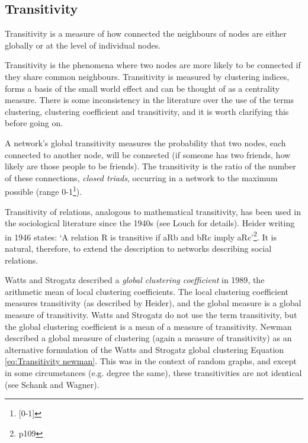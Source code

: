 



\subsection{Transitivity}
\label{sec:transitivity}
Transitivity is a measure of how connected the neighbours of nodes are either globally or at the level of individual nodes. 

Transitivity is the phenomena where two nodes are more likely to be connected if they share common neighbours. Transitivity is measured by clustering indices, forms a basis of the small world effect and can be thought of as a centrality measure. There is some inconsistency in the literature over the use of the terms clustering, clustering coefficient and transitivity, and it is worth clarifying this before going on. 

A network's global transitivity measures the probability that two nodes, each connected to another node, will be connected (if someone has two friends, how likely are those people to be friends). The transitivity is the ratio of the number of these connections, \textit{closed triads}, occurring in a network to the maximum possible (range 0-1\footnote{[0-1]}).

Transitivity of relations, analogous to mathematical transitivity, has been used in the sociological literature since the 1940s (see Louch\cite{louch2000personal} for details). Heider writing in 1946 states: `A relation R is transitive if aRb and bRc imply aRc'\cite{heider1946attitudes}\footnote{p109}. It is natural, therefore, to extend the description to networks describing social relations. 

Watts and Strogatz described a \textit{global clustering coefficient} in 1989\cite{watts1998collective}, the arithmetic mean of local clustering coefficients. The local clustering coefficient measures transitivity (as described by Heider\cite{heider1946attitudes}), and the global measure is a global measure of transitivity. Watts and Strogatz do not use the term transitivity, but the global clustering coefficient is a mean of a measure of transitivity. Newman described a global measure of clustering (again a measure of transitivity) as an alternative formulation of the Watts and Strogatz global clustering Equation \ref{eq:Transitivity newman}\cite{newman2002assortative}. This was in the context of random graphs, and except in some circumstances (e.g. degree the same), these transitivities are not identical (see  Schank and Wagner\cite{schank2005approximating}).

